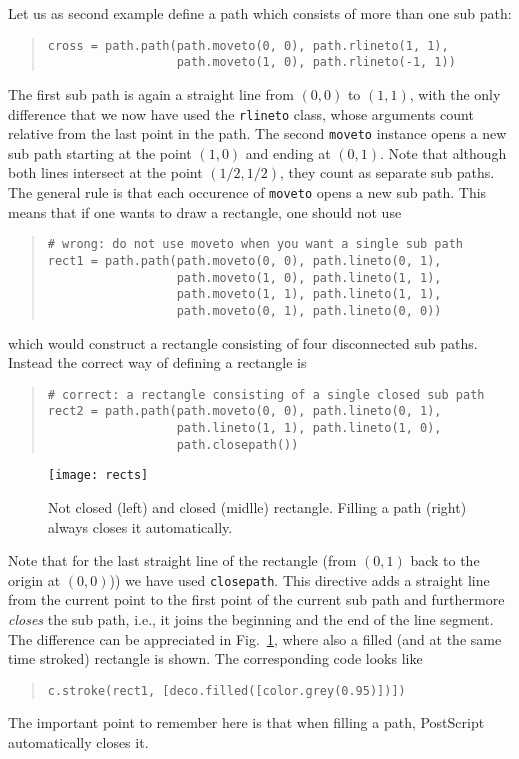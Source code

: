 Let us as second example define a path which consists of more than 
one sub path:
\begin{quote}
\begin{verbatim}
cross = path.path(path.moveto(0, 0), path.rlineto(1, 1),
                  path.moveto(1, 0), path.rlineto(-1, 1))
\end{verbatim}
\end{quote}
The first sub path is again a straight line from $(0, 0)$ to $(1, 1)$,
with the only difference that we now have used the \verb|rlineto|
class, whose arguments count relative from the last point in the path.
The second \verb|moveto| instance opens a new sub path starting at the
point $(1, 0)$ and ending at $(0, 1)$. Note that although both lines
intersect at the point $(1/2, 1/2)$, they count as separate sub paths.
The general rule is that each occurence of \verb|moveto| opens a new
sub path. This means that if one wants to draw a rectangle, one should
not use
\begin{quote}
\begin{verbatim}
# wrong: do not use moveto when you want a single sub path
rect1 = path.path(path.moveto(0, 0), path.lineto(0, 1),
                  path.moveto(1, 0), path.lineto(1, 1),
                  path.moveto(1, 1), path.lineto(1, 1),
                  path.moveto(0, 1), path.lineto(0, 0))
\end{verbatim}
\end{quote}
which would construct a rectangle consisting of four disconnected
sub paths. Instead the correct way of defining a rectangle is 
\begin{quote}
\begin{verbatim}
# correct: a rectangle consisting of a single closed sub path
rect2 = path.path(path.moveto(0, 0), path.lineto(0, 1), 
                  path.lineto(1, 1), path.lineto(1, 0),
                  path.closepath())
\end{verbatim}
\end{quote}
%
\begin{figure}
\centerline{\texttt{[image: rects]}}
\caption{Not closed (left) and closed (midlle) rectangle. Filling a
  path (right) always closes it automatically.}
\label{fig:rects}
\end{figure}
Note that for the last straight line of the rectangle (from $(0, 1)$
back to the origin at $(0, 0)$)) we have used \verb|closepath|.  This
directive adds a straight line from the current point to the first
point of the current sub path and furthermore \textit{closes} the sub
path, i.e., it joins the beginning and the end of the line segment.
The difference can be appreciated in Fig.~\ref{fig:rects}, where
also a filled (and at the same time stroked) rectangle is shown.
The corresponding code looks like
\begin{quote}
\begin{verbatim}
c.stroke(rect1, [deco.filled([color.grey(0.95)])])
\end{verbatim}
\end{quote}
The important point to remember here is that when filling a path, PostScript
automatically closes it.

